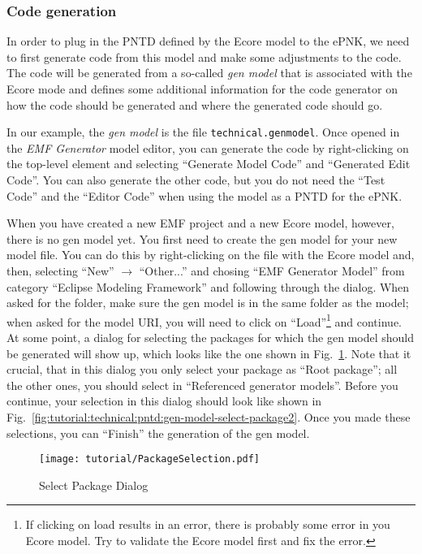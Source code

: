 \subsubsection{Code generation}
\label{subsec:tutorial:technical:pntd:code-gen}

In order to plug in the PNTD defined by the Ecore model to the ePNK, we need to
first generate code from this model and make some adjustments to the code. The code will be generated
from a so-called \emph{gen model} that is associated with the Ecore mode and
defines some additional information for the code generator on how the code
should be generated and where the generated code should go.

In our example, the \emph{gen model} is the file {\tt technical.genmodel}. Once
opened in the \emph{EMF Generator} model editor, you can generate the code by
right-clicking on the top-level element and selecting ``Generate Model Code''
and ``Generated Edit Code''. You can also generate the other code, but you do
not need the ``Test Code'' and the ``Editor Code'' when using the model as
a PNTD for the ePNK.

When you have created a new EMF project and a new Ecore model, however, there
is no gen model yet. You first need to create the gen model for your new model
file.
You can do this by right-clicking on the file with the Ecore model and, then, selecting
``New'' $\rightarrow$ ``Other...'' and chosing ``EMF Generator Model'' from
category ``Eclipse Modeling Framework'' and following through the dialog. When
asked for the folder, make sure the gen model is in the same folder as the
model; when asked for the model URI, you will need to click on ``Load''\footnote
  {If clicking on load results in an error, there is probably some error in you
  Ecore model. Try to validate the Ecore model first and fix the error.}
and continue. At some point, a dialog for selecting the packages for which the
gen model should be generated will show up, which looks like the one
shown in Fig.~\ref{fig:tutorial:technical:pntd:gen-model-select-package1}.
Note that it crucial, that in this dialog you only select your package as
``Root package''; all the other ones, you should select in ``Referenced
generator models''. Before you continue, your selection in this dialog
should look like shown in
Fig.~\ref{fig:tutorial:technical:pntd:gen-model-select-package2}. Once you made
these selections, you can ``Finish'' the generation of the gen model.

\begin{figure}[hbtp!!]
  \centerline{\texttt{[image: tutorial/PackageSelection.pdf]}}
  \caption{Select Package Dialog}
  \label{fig:tutorial:technical:pntd:gen-model-select-package1}
\end{figure}

